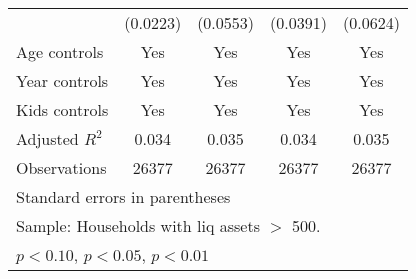 {\begin{longtable}{l*{4}{c}}
                    &    (0.0223)         &    (0.0553)         &    (0.0391)         &    (0.0624)         \\
\addlinespace
Age controls        &         Yes         &         Yes         &         Yes         &         Yes         \\
\addlinespace
Year controls       &         Yes         &         Yes         &         Yes         &         Yes         \\
\addlinespace
Kids controls       &         Yes         &         Yes         &         Yes         &         Yes         \\
\midrule
Adjusted \(R^{2}\)  &       0.034         &       0.035         &       0.034         &       0.035         \\
Observations        &       26377         &       26377         &       26377         &       26377         \\
\bottomrule
\multicolumn{5}{l}{\footnotesize Standard errors in parentheses}\\
\multicolumn{5}{l}{\footnotesize Sample: Households with liq assets $>$ 500.}\\
\multicolumn{5}{l}{\footnotesize \sym{*} \(p<0.10\), \sym{**} \(p<0.05\), \sym{***} \(p<0.01\)}\\
\end{longtable}
}
